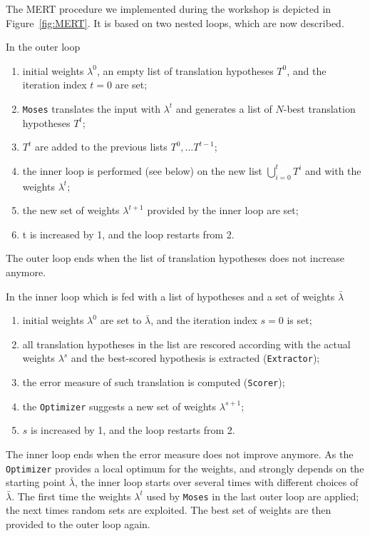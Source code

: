 \documentclass[11pt]{book}
\theoremstyle{plain}
\begin{document}
The MERT procedure we implemented during the workshop is depicted in Figure~\ref{fig:MERT}. 
It is based on two nested loops, which are now described.

In the outer loop 
\begin{enumerate}
\item initial weights $\lambda^0$, an empty list of translation hypotheses $T^0$, and the iteration index $t=0$ are set;
\item {\tt Moses} translates the input with  $\lambda^t$ and generates a list of $N$-best translation hypotheses $T^t$;
\item $T^t$ are added to the previous lists $T^0, \ldots T^{t-1}$;
\item the inner loop is performed (see below) on the new list $\bigcup_{i=0}^{t}T^i$ and with the weights $\lambda^t$;
\item the  new set of weights $\lambda^{t+1}$ provided by the inner loop are set;
\item t is increased by 1, and the loop restarts from 2.
\end{enumerate}
The outer loop ends when the list of translation hypotheses does not increase anymore.

In the inner loop which  is fed with a list of hypotheses and a set of weights $\bar \lambda$
\begin{enumerate}
\item initial weights $\lambda^0$ are set to $\bar \lambda$, and the iteration index $s=0$ is set;
\item all translation hypotheses in the list are rescored according with the actual weights $\lambda^s$
and the best-scored hypothesis is extracted ({\tt Extractor});
\item the error measure of such translation is computed ({\tt Scorer});
\item the {\tt Optimizer} suggests a new set of weights $\lambda^{s+1}$;
\item $s$ is increased by 1, and the loop restarts from 2.
\end{enumerate}
The inner loop ends when the error measure does not improve anymore.
As the {\tt Optimizer} provides a local optimum for the weights, and strongly depends on the starting point $\bar \lambda$, the inner loop starts over several  times with different choices of $\bar \lambda$. The first time the weights $\lambda^t$ used by {\tt Moses} in the last outer loop are applied; the next times random sets are exploited. The best set of weights are then provided to the outer loop again.
\end{document}
